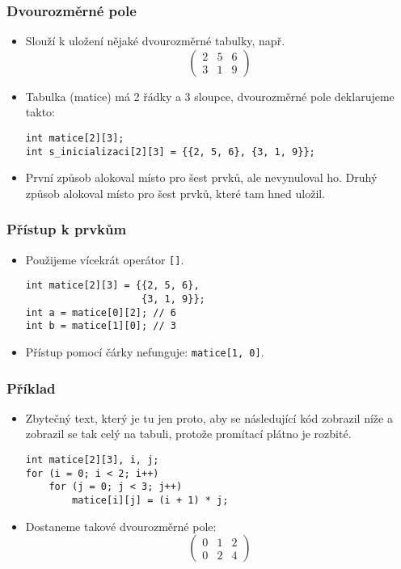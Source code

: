 \documentclass{beamer}
\newenvironment{itemizex}%
  {\large \begin{itemize}%
    \setlength{\itemsep}{8pt}%
    \setlength{\parskip}{8pt}}%
  {\end{itemize}}
\begin{document}
\begin{frame}[t,fragile]\frametitle{Dvourozměrné pole} 
    \begin{itemizex}
        \item Slouží k uložení nějaké dvourozměrné tabulky, např.
$$
\begin{pmatrix}
2&5&6\\
3&1&9
\end{pmatrix}
$$
        \item Tabulka (matice) má 2 řádky a 3 sloupce, dvourozměrné pole deklarujeme takto:
\begin{verbatim} 
int matice[2][3];
int s_inicializaci[2][3] = {{2, 5, 6}, {3, 1, 9}};
\end{verbatim}
        \item První způsob alokoval místo pro šest prvků, ale nevynuloval ho. Druhý způsob alokoval místo pro šest prvků, které tam hned uložil. 
    \end{itemizex}
\end{frame}


\begin{frame}[t,fragile]\frametitle{Přístup k prvkům} 
    \vskip 1cm
    \begin{itemizex}
        \item Použijeme vícekrát operátor \texttt{[]}.
\begin{verbatim} 
int matice[2][3] = {{2, 5, 6}, 
                    {3, 1, 9}};
int a = matice[0][2]; // 6
int b = matice[1][0]; // 3
\end{verbatim}
        \item Přístup pomocí čárky nefunguje: \texttt{matice[1, 0]}. 
    \end{itemizex}
\end{frame}


\begin{frame}[t,fragile]\frametitle{Příklad} 
\begin{itemizex}
    \item Zbytečný text, který je tu jen proto, aby se následující kód zobrazil níže a zobrazil se tak celý na tabuli, protože promítací plátno je rozbité. 

\begin{verbatim} 
int matice[2][3], i, j;
for (i = 0; i < 2; i++)
    for (j = 0; j < 3; j++)
        matice[i][j] = (i + 1) * j;
\end{verbatim}
    \item Dostaneme takové dvourozměrné pole:
$$
\begin{pmatrix}
0&1&2\\
0&2&4
\end{pmatrix}
$$
\end{itemizex}
\end{frame}
\end{document}
